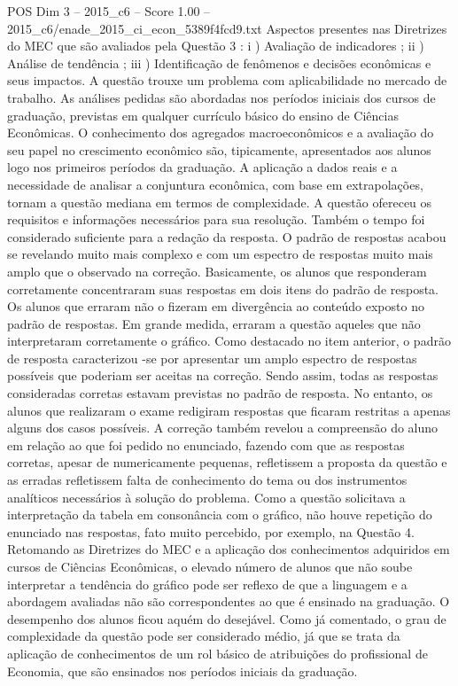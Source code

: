 \begin{textsample}{POS Dim 3 – 2015\_c6 – Score 1.00 – 2015\_c6/enade\_2015\_ci\_econ\_5389f4fcd9.txt}
Aspectos presentes nas Diretrizes do MEC que são avaliados pela Questão 3 : i ) Avaliação de indicadores ; ii ) Análise de tendência ; iii ) Identificação de fenômenos e decisões econômicas e seus impactos.
A questão trouxe um problema com aplicabilidade no mercado de trabalho.
As análises pedidas são abordadas nos períodos iniciais dos cursos de graduação, previstas em qualquer currículo básico do ensino de Ciências Econômicas.
O conhecimento dos agregados macroeconômicos e a avaliação do seu papel no crescimento econômico são, tipicamente, apresentados aos alunos logo nos primeiros períodos da graduação.
A aplicação a dados reais e a necessidade de analisar a conjuntura econômica, com base em extrapolações, tornam a questão mediana em termos de complexidade.
A questão ofereceu os requisitos e informações necessários para sua resolução.
Também o tempo foi considerado suficiente para a redação da resposta.
O padrão de respostas acabou se revelando muito mais complexo e com um espectro de respostas muito mais amplo que o observado na correção.
Basicamente, os alunos que responderam corretamente concentraram suas respostas em dois itens do padrão de resposta.
Os alunos que erraram não o fizeram em divergência ao conteúdo exposto no padrão de respostas.
Em grande medida, erraram a questão aqueles que não interpretaram corretamente o gráfico.
Como destacado no item anterior, o padrão de resposta caracterizou -se por apresentar um amplo espectro de respostas possíveis que poderiam ser aceitas na correção.
Sendo assim, todas as respostas consideradas corretas estavam previstas no padrão de resposta.
No entanto, os alunos que realizaram o exame redigiram respostas que ficaram restritas a apenas alguns dos casos possíveis.
A correção também revelou a compreensão do aluno em relação ao que foi pedido no enunciado, fazendo com que as respostas corretas, apesar de numericamente pequenas, refletissem a proposta da questão e as erradas refletissem falta de conhecimento do tema ou dos instrumentos analíticos necessários à solução do problema.
Como a questão solicitava a interpretação da tabela em consonância com o gráfico, não houve repetição do enunciado nas respostas, fato muito percebido, por exemplo, na Questão 4.
Retomando as Diretrizes do MEC e a aplicação dos conhecimentos adquiridos em cursos de Ciências Econômicas, o elevado número de alunos que não soube interpretar a tendência do gráfico pode ser reflexo de que a linguagem e a abordagem avaliadas não são correspondentes ao que é ensinado na graduação.
O desempenho dos alunos ficou aquém do desejável.
Como já comentado, o grau de complexidade da questão pode ser considerado médio, já que se trata da aplicação de conhecimentos de um rol básico de atribuições do profissional de Economia, que são ensinados nos períodos iniciais da graduação.

\end{textsample}
